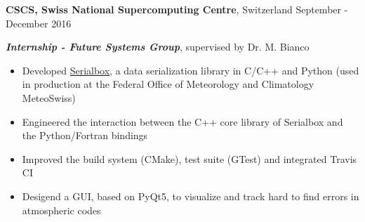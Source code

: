 
\textbf{CSCS, Swiss National Supercomputing Centre}, Switzerland \hfill September - December 2016

\textbf{\textit{Internship - Future Systems Group}}, supervised by Dr. M. Bianco

\begin{itemize}
    \item Developed \href{https://github.com/eth-cscs/serialbox2}{Serialbox}, a data serialization library in C/C++ and Python (used in production at the Federal Office of Meteorology and Climatology MeteoSwiss)
    \item Engineered the interaction between the C++ core library of Serialbox and the Python/Fortran bindings
	\item Improved the build system (CMake), test suite (GTest) and integrated Travis CI
    \item Desigend a GUI, based on PyQt5, to visualize and track hard to find errors in atmospheric codes
\end{itemize}
